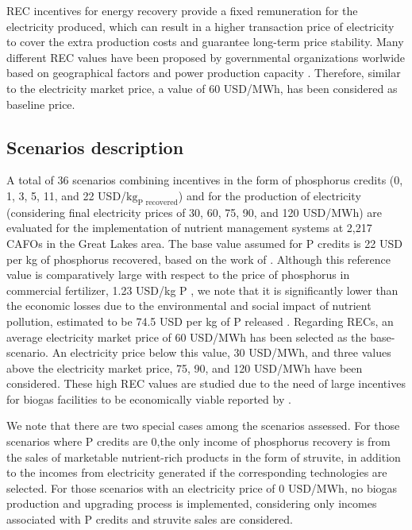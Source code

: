 \begin{refsection}[referencesCh5]
REC incentives for energy recovery provide a fixed remuneration for the electricity produced, which can result in a higher transaction price of electricity to cover the extra production costs and guarantee long-term price stability. Many different REC values have been proposed by governmental organizations worlwide based on geographical factors and power production capacity \citep{Deremince}. Therefore, similar to the electricity market price, a value of 60 USD/MWh, has been considered as baseline price.

\subsection{Scenarios description}
A total of 36 scenarios combining incentives in the form of phosphorus credits (0, 1, 3, 5, 11, and 22 USD/${\text{kg}_\text{P recovered}}$) and for the production of electricity (considering final electricity prices of 30, 60, 75, 90, and 120 USD/MWh) are evaluated for the implementation of nutrient management systems at 2,217 CAFOs in the Great Lakes area. The base value assumed for P credits is 22 USD per kg of phosphorus recovered, based on the work of \citet{sampat_economic_2018}. Although this reference value is comparatively large with respect to the price of phosphorus in commercial fertilizer, 1.23 USD/kg P \citep{fertilizers_price}, we note that it is significantly lower than the economic losses due to the environmental and social impact of nutrient pollution, estimated to be 74.5 USD per kg of P released \citep{Sampat2020}. Regarding RECs, an average electricity market price of 60 USD/MWh has been selected as the base-scenario. An electricity price below this value, 30 USD/MWh, and three values above the electricity market price, 75, 90, and 120 USD/MWh have been considered. These high REC values are studied due to the need of large incentives for biogas facilities to be economically viable reported by \citet{sampat_economic_2018}.

We note that there are two special cases among the scenarios assessed. For those scenarios where P credits are 0,the only income of phosphorus recovery is from the sales of marketable nutrient-rich products in the form of struvite, in addition to the incomes from electricity generated if the corresponding technologies are selected. For those scenarios with an electricity price of 0 USD/MWh, no biogas production and upgrading process is implemented, considering only incomes associated with P credits and struvite sales are considered.


\end{refsection}
